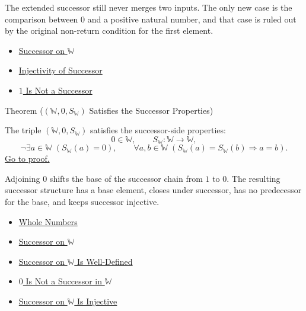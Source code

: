 \begin{remark*}[Interpretation]
The extended successor still never merges two inputs. The only new case is the
comparison between $0$ and a positive natural number, and that case is ruled
out by the original non-return condition for the first element.
\end{remark*}

\begin{dependencies}
\begin{itemize}
  \item \hyperref[def:successor-on-w]{Successor on $\mathbb{W}$}
  \item \hyperref[ax:peano-successor-injective]{Injectivity of Successor}
  \item \hyperref[ax:peano-base-not-successor]{$1$ Is Not a Successor}
\end{itemize}
\end{dependencies}

\begin{theorembox}{Theorem (\texorpdfstring{$(\mathbb{W},0,S_{\mathbb{W}})$}{(W,0,S_W)} Satisfies the Successor Properties)}
\begin{theorem}
\label{thm:w-successor-system-properties}
The triple $(\mathbb{W},0,S_{\mathbb{W}})$ satisfies the successor-side
properties:
\[
0\in\mathbb{W},\qquad
S_{\mathbb{W}}:\mathbb{W}\to\mathbb{W},
\]
\[
\neg\exists a\in\mathbb{W}\;(S_{\mathbb{W}}(a)=0),
\qquad
\forall a,b\in\mathbb{W}\;
(S_{\mathbb{W}}(a)=S_{\mathbb{W}}(b)\Longrightarrow a=b).
\]
\hyperref[prf:w-successor-system-properties]{Go to proof.}
\end{theorem}
\end{theorembox}

\begin{remark*}[Interpretation]
Adjoining $0$ shifts the base of the successor chain from $1$ to $0$. The
resulting successor structure has a base element, closes under successor, has
no predecessor for the base, and keeps successor injective.
\end{remark*}

\begin{dependencies}
\begin{itemize}
  \item \hyperref[def:whole-numbers]{Whole Numbers}
  \item \hyperref[def:successor-on-w]{Successor on $\mathbb{W}$}
  \item \hyperref[thm:successor-on-w-well-defined]{Successor on $\mathbb{W}$ Is Well-Defined}
  \item \hyperref[thm:zero-is-not-successor-in-w]{$0$ Is Not a Successor in $\mathbb{W}$}
  \item \hyperref[thm:successor-on-w-injective]{Successor on $\mathbb{W}$ Is Injective}
\end{itemize}
\end{dependencies}
